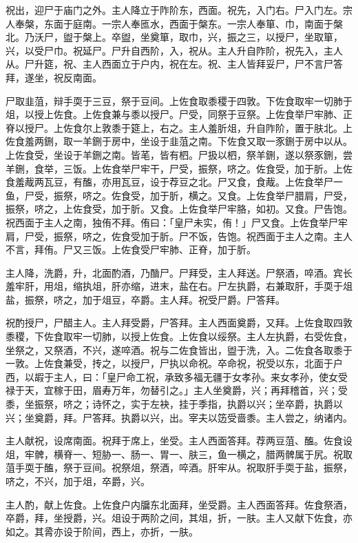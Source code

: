 \documentclass[]{article}
\begin{document}
祝出，迎尸于庙门之外。主人降立于阼阶东，西面。祝先，入门右。尸入门左。宗人奉槃，东面于庭南。一宗人奉匜水，西面于槃东。一宗人奉箪、巾，南面于槃北。乃沃尸，盥于槃上。卒盥，坐奠箪，取巾，兴，振之三，以授尸，坐取箪，兴，以受尸巾。祝延尸。尸升自西阶，入，祝从。主人升自阼阶，祝先入，主人从。尸升筵，祝、主人西面立于户内，祝在左。祝、主人皆拜妥尸，尸不言尸答拜，遂坐，祝反南面。

尸取韭菹，辩手耎于三豆，祭于豆间。上佐食取黍稷于四敦。下佐食取牢一切肺于俎，以授上佐食。上佐食兼与黍以授尸。尸受，同祭于豆祭。上佐食举尸牢肺、正脊以授尸。上佐食尔上敦黍于筵上，右之。主人羞肵俎，升自阼阶，置于肤北。上佐食羞两鉶，取一羊鉶于房中，坐设于韭菹之南。下佐食又取一豕鉶于房中以从。上佐食受，坐设于羊鉶之南。皆芼，皆有柶。尸扱以柶，祭羊鉶，遂以祭豕鉶，尝羊鉶，食举，三饭。上佐食举尸牢干，尸受，振祭，哜之。佐食受，加于肵。上佐食羞胾两瓦豆，有醢，亦用瓦豆，设于荐豆之北。尸又食，食胾。上佐食举尸一鱼，尸受，振祭，哜之。佐食受，加于肵，横之。又食。上佐食举尸腊肩，尸受，振祭，哜之，上佐食受，加于肵。又食。上佐食举尸牢胳，如初。又食。尸告饱。祝西面于主人之南，独侑不拜。侑曰：「皇尸未实，侑！」尸又食。上佐食举尸牢肩，尸受，振祭，哜之，佐食受加于肵。尸不饭，告饱。祝西面于主人之南。主人不言，拜侑。尸又三饭。上佐食受尸牢肺、正脊，加于肵。

主人降，洗爵，升，北面酌酒，乃酳尸。尸拜受，主人拜送。尸祭酒，啐酒。宾长羞牢肝，用俎，缩执俎，肝亦缩，进末，盐在右。尸左执爵，右兼取肝，手耎于俎盐，振祭，哜之，加于俎豆，卒爵。主人拜。祝受尸爵。尸答拜。

祝酌授尸，尸醋主人。主人拜受爵，尸答拜。主人西面奠爵，又拜。上佐食取四敦黍稷，下佐食取牢一切肺，以授上佐食。上佐食以绥祭。主人左执爵，右受佐食，坐祭之，又祭酒，不兴，遂啐酒。祝与二佐食皆出，盥于洗，入。二佐食各取黍于一敦。上佐食兼受，抟之，以授尸，尸执以命祝。卒命祝，祝受以东，北面于户西，以嘏于主人，曰：「皇尸命工祝，承致多福无疆于女孝孙。来女孝孙，使女受禄于天，宜稼于田，眉寿万年，勿替引之。」主人坐奠爵，兴；再拜稽首，兴；受黍，坐振祭，哜之；诗怀之，实于左袂，挂于季指，执爵以兴；坐卒爵，执爵以兴；坐奠爵，拜。尸答拜。执爵以兴，出。宰夫以笾受啬黍。主人尝之，纳诸内。

主人献祝，设席南面。祝拜于席上，坐受。主人西面答拜。荐两豆菹、醢。佐食设俎，牢髀，横脊一、短胁一、肠一、胃一、肤三，鱼一横之，腊两髀属于尻。祝取菹手耎于醢，祭于豆间。祝祭俎，祭酒，啐酒。肝牢从。祝取肝手耎于盐，振祭，哜之，不兴，加于俎，卒爵，兴。

主人酌，献上佐食。上佐食户内牖东北面拜，坐受爵。主人西面答拜。佐食祭酒，卒爵，拜，坐授爵，兴。俎设于两阶之间，其俎，折，一肤。主人又献下佐食，亦如之。其脀亦设于阶间，西上，亦折，一肤。
\end{document}
